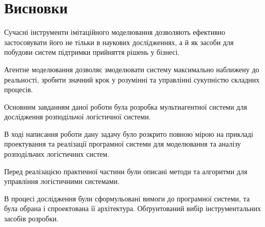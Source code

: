 \section*{Висновки}
Сучасні інструменти імітаційного моделювання дозволяють ефективно застосовувати його
не тільки в наукових дослідженнях, а й як засоби для побудови систем підтримки прийняття рішень у бізнесі. 

Агентне моделювання дозволяє змоделювати систему максимально наближену до реальності, зробити значний крок у розумінні та управлінні сукупністю складних процесів.

Основним завданням даної роботи була розробка мультиагентної системи для дослідження розподільчої логістичної системи.

В ході написання роботи дану задачу було розкрито повною мірою на прикладі проектування та реалізації програмної системи для моделювання та аналізу розподільчих логістичних систем.

Перед реалізацією практичної частини були описані методи та алгоритми для управління логістичними системами. 

В процесі дослідження були сформульовані вимоги до програмної системи, та була обрана і спроектована її архітектура. 
Обґрунтований вибір інструментальних засобів розробки.
